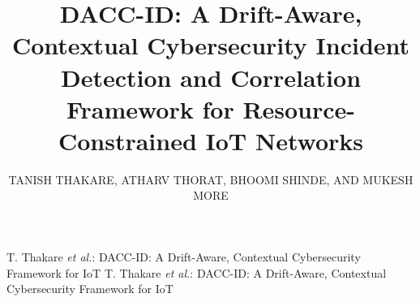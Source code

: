 \documentclass{ieeeaccess}
\begin{document}
\doi{}

\title{DACC-ID: A Drift-Aware, Contextual Cybersecurity Incident Detection and Correlation Framework for Resource-Constrained IoT Networks}

\author{\uppercase{Tanish Thakare}, \uppercase{Atharv Thorat}, \uppercase{Bhoomi Shinde}, \uppercase{and Mukesh More}}

\address[1]{International Institute Of Information Technology, Pune}


\markboth
{T. Thakare \textit{et al.}: DACC-ID: A Drift-Aware, Contextual Cybersecurity Framework for IoT}
{T. Thakare \textit{et al.}: DACC-ID: A Drift-Aware, Contextual Cybersecurity Framework for IoT}

\corresp{}
\end{document}
